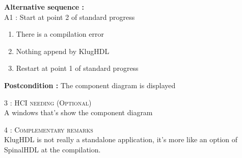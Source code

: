 \begin{flushleft}
    \textbf{\large  Alternative sequence :}\\
    A1 : Start at point 2 of standard progress
    \begin{enumerate}[nosep]
        \item There is a compilation error
        \item Nothing append by KlugHDL
        \item Restart at point 1 of standard progress
    \end{enumerate}

    \textbf{\large Postcondition :} The component diagram is displayed

    \BlackLine
    \textsc{\Large 3 : HCI needing (Optional)}\\[0.3cm]

    A windows that's show the component diagram

    \BlackLine
    \textsc{\Large 4 : Complementary remarks}\\[0.3cm]

    KlugHDL is not really a standalone application, it's more like an option of SpinalHDL at the compilation.


\end{flushleft}
